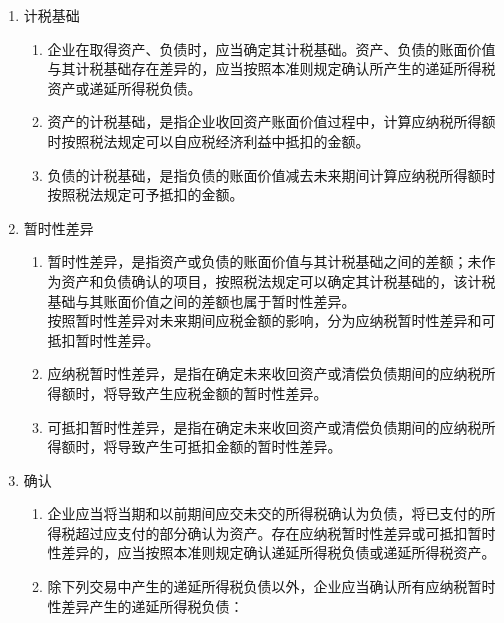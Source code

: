 \begin{appendices}
\begin{enumerate}[itemsep=0pt, leftmargin=1cm, before=\normalfont\small]
\begin{enumerate}[itemsep=0pt, leftmargin=1cm, before=\normalfont\small]
              \end{enumerate}
        \item 计税基础
              \begin{enumerate}[itemsep=0pt, leftmargin=1cm, before=\normalfont\small, start=4]
                  \item 企业在取得资产、负债时，应当确定其计税基础。资产、负债的账面价值与其计税基础存在差异的，应当按照本准则规定确认所产生的递延所得税资产或递延所得税负债。
                  \item 资产的计税基础，是指企业收回资产账面价值过程中，计算应纳税所得额时按照税法规定可以自应税经济利益中抵扣的金额。
                  \item 负债的计税基础，是指负债的账面价值减去未来期间计算应纳税所得额时按照税法规定可予抵扣的金额。
              \end{enumerate}
        \item 暂时性差异
              \begin{enumerate}[itemsep=0pt, leftmargin=1cm, before=\normalfont\small, start=7] %
                  \item 暂时性差异，是指资产或负债的账面价值与其计税基础之间的差额；未作为资产和负债确认的项目，按照税法规定可以确定其计税基础的，该计税基础与其账面价值之间的差额也属于暂时性差异。\\按照暂时性差异对未来期间应税金额的影响，分为应纳税暂时性差异和可抵扣暂时性差异。
                  \item 应纳税暂时性差异，是指在确定未来收回资产或清偿负债期间的应纳税所得额时，将导致产生应税金额的暂时性差异。
                  \item 可抵扣暂时性差异，是指在确定未来收回资产或清偿负债期间的应纳税所得额时，将导致产生可抵扣金额的暂时性差异。
              \end{enumerate}
        \item 确认
              \begin{enumerate}[itemsep=0pt, leftmargin=1cm, before=\normalfont\small, start=10] %
                  \item 企业应当将当期和以前期间应交未交的所得税确认为负债，将已支付的所得税超过应支付的部分确认为资产。存在应纳税暂时性差异或可抵扣暂时性差异的，应当按照本准则规定确认递延所得税负债或递延所得税资产。
                  \item 除下列交易中产生的递延所得税负债以外，企业应当确认所有应纳税暂时性差异产生的递延所得税负债：
                        \begin{enumerate}[itemsep=0pt, leftmargin=1cm, before=\normalfont\small, start=1] %

\end{enumerate}
\end{enumerate}
\end{enumerate}
\end{appendices}
